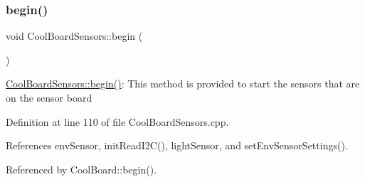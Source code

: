\subsubsection{\texorpdfstring{begin()}{begin()}}
{\footnotesize\ttfamily void Cool\+Board\+Sensors\+::begin (\begin{DoxyParamCaption}{ }\end{DoxyParamCaption})}

\hyperlink{classCoolBoardSensors_a97095823ef7c8f5290812f1405b966b3}{Cool\+Board\+Sensors\+::begin()}\+: This method is provided to start the sensors that are on the sensor board 

Definition at line 110 of file Cool\+Board\+Sensors.\+cpp.



References env\+Sensor, init\+Read\+I2\+C(), light\+Sensor, and set\+Env\+Sensor\+Settings().



Referenced by Cool\+Board\+::begin().


